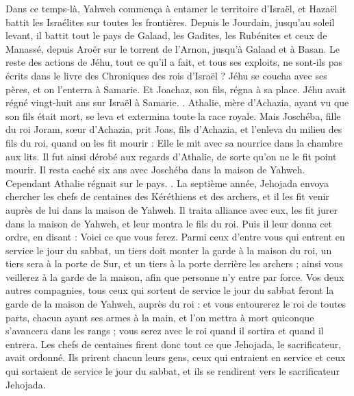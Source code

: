 \begin{multicols}{2}
Dans ce temps-là, Yahweh commença à entamer le territoire d'Israël, et Hazaël battit les Israélites sur toutes les frontières.
Depuis le Jourdain, jusqu'au soleil levant, il battit tout le pays de Galaad, les Gadites, les Rubénites et ceux de Manassé, depuis Aroër sur le torrent de l'Arnon, jusqu'à Galaad et à Basan.
Le reste des actions de Jéhu, tout ce qu'il a fait, et tous ses exploits, ne sont-ils pas écrits dans le livre des Chroniques des rois d'Israël ?
Jéhu se coucha avec ses pères, et on l'enterra à Samarie. Et Joachaz, son fils, régna à sa place.
Jéhu avait régné vingt-huit ans sur Israël à Samarie.
.
\VerseOne{}Athalie, mère d'Achazia, ayant vu que son fils était mort, se leva et extermina toute la race royale.
Mais Joschéba, fille du roi Joram, sœur d'Achazia, prit Joas, fils d'Achazia, et l'enleva du milieu des fils du roi, quand on les fit mourir : Elle le mit avec sa nourrice dans la chambre aux lits. Il fut ainsi dérobé aux regards d'Athalie, de sorte qu'on ne le fit point mourir.
Il resta caché six ans avec Joschéba dans la maison de Yahweh. Cependant Athalie régnait sur le pays.
.
La septième année, Jehojada envoya chercher les chefs de centaines des Kéréthiens et des archers, et il les fit venir auprès de lui dans la maison de Yahweh. Il traita alliance avec eux, les fit jurer dans la maison de Yahweh, et leur montra le fils du roi.
Puis il leur donna cet ordre, en disant : Voici ce que vous ferez. Parmi ceux d'entre vous qui entrent en service le jour du sabbat, un tiers doit monter la garde à la maison du roi,
un tiers sera à la porte de Sur, et un tiers à la porte derrière les archers ; ainsi vous veillerez à la garde de la maison, afin que personne n'y entre par force.
Vos deux autres compagnies, tous ceux qui sortent de service le jour du sabbat feront la garde de la maison de Yahweh, auprès du roi :
et vous entourerez le roi de toutes parts, chacun ayant ses armes à la main, et l'on mettra à mort quiconque s'avancera dans les rangs ; vous serez avec le roi quand il sortira et quand il entrera.
Les chefs de centaines firent donc tout ce que Jehojada, le sacrificateur, avait ordonné. Ils prirent chacun leurs gens, ceux qui entraient en service et ceux qui sortaient de service le jour du sabbat, et ils se rendirent vers le sacrificateur Jehojada.

\end{multicols}
